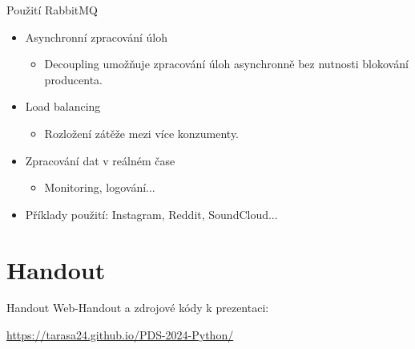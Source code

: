 \documentclass{beamer}
\begin{document}
\begin{frame}{Použití RabbitMQ}
	\begin{itemize}
		\item Asynchronní zpracování úloh
		\begin{itemize}
			\item [\textendash] Decoupling umožňuje zpracování úloh asynchronně bez nutnosti blokování producenta.
		\end{itemize}
		\item Load balancing
		\begin{itemize}
			\item [\textendash] Rozložení zátěže mezi více konzumenty.
		\end{itemize}
		\item Zpracování dat v reálném čase
		\begin{itemize}
			\item [\textendash] Monitoring, logování...
		\end{itemize}
		\item Příklady použití: Instagram, Reddit, SoundCloud...
	\end{itemize}
\end{frame}

\section{Handout}
\begin{frame}{Handout}
    Web-Handout a zdrojové kódy k prezentaci:
    \begin{center}
        \url{https://tarasa24.github.io/PDS-2024-Python/}
    \end{center}
\end{frame}
\end{document}
